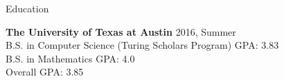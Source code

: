 \documentclass{resume} %
\begin{document}

\begin{rSection}{Education}

{\bf The University of Texas at Austin} \hfill {2016, Summer} \\ 
B.S. in Computer Science (Turing Scholars Program) \hfill {GPA: 3.83} \\
B.S. in  Mathematics \hfill {GPA: 4.0} \\
Overall GPA: 3.85
\end{rSection}




\end{document}
